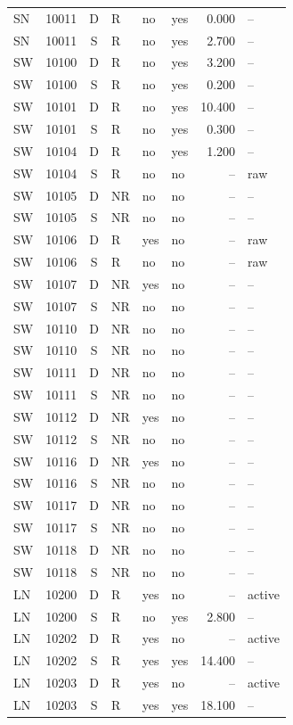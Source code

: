 \begin{longtable}{@{}llclllrl@{}}
SN & 10011 & D & R & no & yes & 0.000 & --\\
SN & 10011 & S & R & no & yes & 2.700 & --\\
SW & 10100 & D & R & no & yes & 3.200 & --\\
SW & 10100 & S & R & no & yes & 0.200 & --\\
SW & 10101 & D & R & no & yes & 10.400 & --\\
SW & 10101 & S & R & no & yes & 0.300 & --\\
SW & 10104 & D & R & no & yes & 1.200 & --\\
SW & 10104 & S & R & no & no & -- & raw\\
SW & 10105 & D & NR & no & no & -- & --\\
SW & 10105 & S & NR & no & no & -- & --\\
SW & 10106 & D & R & yes & no & -- & raw\\
SW & 10106 & S & R & no & no & -- & raw\\
SW & 10107 & D & NR & yes & no & -- & --\\
SW & 10107 & S & NR & no & no & -- & --\\
SW & 10110 & D & NR & no & no & -- & --\\
SW & 10110 & S & NR & no & no & -- & --\\
SW & 10111 & D & NR & no & no & -- & --\\
SW & 10111 & S & NR & no & no & -- & --\\
SW & 10112 & D & NR & yes & no & -- & --\\
SW & 10112 & S & NR & no & no & -- & --\\
SW & 10116 & D & NR & yes & no & -- & --\\
SW & 10116 & S & NR & no & no & -- & --\\
SW & 10117 & D & NR & no & no & -- & --\\
SW & 10117 & S & NR & no & no & -- & --\\
SW & 10118 & D & NR & no & no & -- & --\\
SW & 10118 & S & NR & no & no & -- & --\\
LN & 10200 & D & R & yes & no & -- & active\\
LN & 10200 & S & R & no & yes & 2.800 & --\\
LN & 10202 & D & R & yes & no & -- & active\\
LN & 10202 & S & R & yes & yes & 14.400 & --\\
LN & 10203 & D & R & yes & no & -- & active\\
LN & 10203 & S & R & yes & yes & 18.100 & --\\

\end{longtable}
